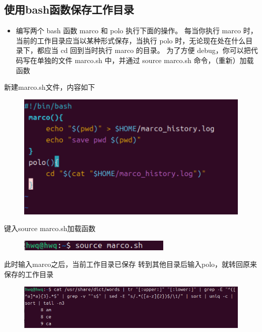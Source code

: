 \documentclass[a4paper, 12pt]{article}
\begin{document}
\subsection{使用bash函数保存工作目录}
\begin{itemize}
    \item 编写两个 bash 函数 marco 和 polo 执行下面的操作。 每当你执行 marco 时，当前的工作目录应当以某种形式保存，当执行 polo 时，无论现在处在什么目录下，都应当 cd 回到当时执行 marco 的目录。 为了方便 debug，你可以把代码写在单独的文件 marco.sh 中，并通过 source marco.sh 命令，（重新）加载函数
\end{itemize}
新建marco.sh文件，内容如下
\begin{figure}[H]
    \centering
    \includegraphics[width=1\linewidth]{shell16.png}
\end{figure}
键入source marco.sh加载函数
\begin{figure}[H]
    \centering
    \includegraphics[width=1\linewidth]{shell17.png}
\end{figure}
此时输入marco之后，当前工作目录已保存
转到其他目录后输入polo，就转回原来保存的工作目录
\begin{figure}[H]
    \centering
    \includegraphics[width=1\linewidth]{image.png}
\end{figure}
\end{document}
